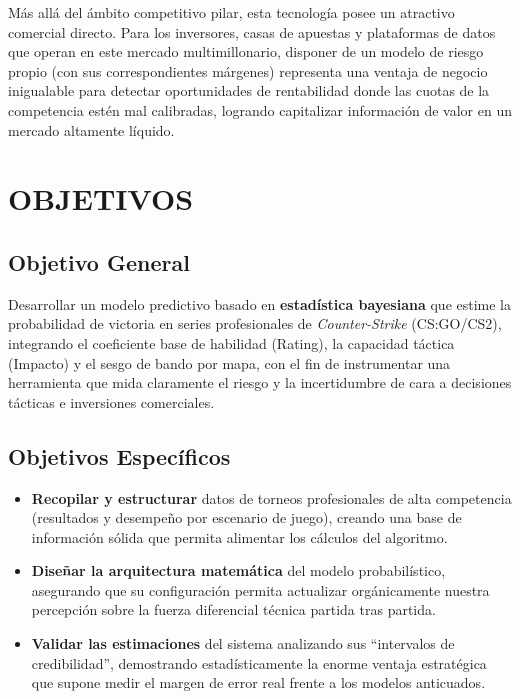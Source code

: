 \documentclass[twocolumn,10pt]{article}
\begin{document}
Más allá del ámbito competitivo pilar, esta tecnología posee un atractivo comercial directo. Para los inversores, casas de apuestas y plataformas de datos que operan en este mercado multimillonario, disponer de un modelo de riesgo propio (con sus correspondientes márgenes) representa una ventaja de negocio inigualable para detectar oportunidades de rentabilidad donde las cuotas de la competencia estén mal calibradas, logrando capitalizar información de valor en un mercado altamente líquido.

\section{OBJETIVOS}

\subsection{Objetivo General}

Desarrollar un modelo predictivo basado en \textbf{estadística bayesiana} que estime la probabilidad de victoria en series profesionales de \textit{Counter-Strike} (CS:GO/CS2), integrando el coeficiente base de habilidad (Rating), la capacidad táctica (Impacto) y el sesgo de bando por mapa, con el fin de instrumentar una herramienta que mida claramente el riesgo y la incertidumbre de cara a decisiones tácticas e inversiones comerciales.

\subsection{Objetivos Específicos}

\begin{itemize}[noitemsep]
    \item \textbf{Recopilar y estructurar} datos de torneos profesionales de alta competencia (resultados y desempeño por escenario de juego), creando una base de información sólida que permita alimentar los cálculos del algoritmo.
    \item \textbf{Diseñar la arquitectura matemática} del modelo probabilístico, asegurando que su configuración permita actualizar orgánicamente nuestra percepción sobre la fuerza diferencial técnica partida tras partida.
    \item \textbf{Validar las estimaciones} del sistema analizando sus ``intervalos de credibilidad'', demostrando estadísticamente la enorme ventaja estratégica que supone medir el margen de error real frente a los modelos anticuados.
\end{itemize}
\end{document}
